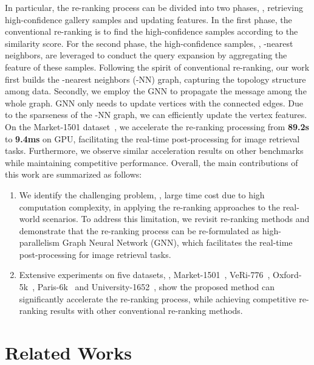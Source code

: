 \documentclass[10pt,twocolumn,letterpaper]{article}
\begin{document}
In particular, the re-ranking process can be divided into two phases, \ie, retrieving high-confidence gallery samples and updating features. 
In the first phase, the conventional re-ranking is to find the high-confidence samples according to the similarity score. For the second phase, the high-confidence samples, \eg, -nearest neighbors, are leveraged to conduct the query expansion by aggregating the feature of these samples. 
Following the spirit of conventional re-ranking, our work first builds the -nearest neighbors (-NN) graph, capturing the topology structure among data. Secondly, we employ the GNN to propagate the message among the whole graph. GNN only needs to update vertices with the connected edges. Due to the sparseness of the -NN graph, we can efficiently update the vertex features. 
On the Market-1501 dataset~\cite{zheng2015scalable}, we accelerate the re-ranking processing from \textbf{89.2s} to \textbf{9.4ms} on GPU, facilitating the real-time post-processing for image retrieval tasks. Furthermore, we observe similar acceleration results on other benchmarks while maintaining competitive performance.
Overall, the main contributions of this work are summarized
as follows:
\begin{enumerate}
\item  
We identify the challenging problem, \ie, large time cost due to high computation complexity, in applying the re-ranking approaches to the real-world scenarios. To address this limitation, we revisit re-ranking methods and demonstrate that the re-ranking process can be re-formulated as high-parallelism Graph Neural Network (GNN), which facilitates the real-time post-processing for image retrieval tasks. 

\item 
Extensive experiments on five datasets, \ie, Market-1501~\cite{zheng2015scalable}, VeRi-776~\cite{liu2016deep}, Oxford-5k~\cite{philbin2007object}, Paris-6k~\cite{philbin2008lost} and University-1652~\cite{zheng2020university}, show the proposed method can significantly accelerate the re-ranking process, while achieving competitive re-ranking results with other conventional re-ranking methods.
\end{enumerate}

\section{Related Works}
\end{document}
